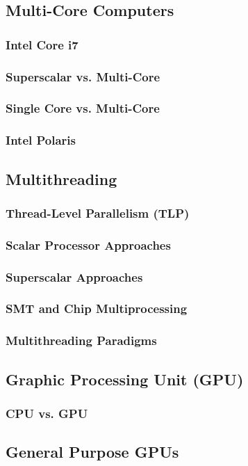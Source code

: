 \documentclass[titlepage, a4paper]{article}
\begin{document}
\subsection{Multi-Core Computers}
\subsubsection{Intel Core i7}
\subsubsection{Superscalar vs. Multi-Core}
\subsubsection{Single Core vs. Multi-Core}
\subsubsection{Intel Polaris}
\subsection{Multithreading}
\subsubsection{Thread-Level Parallelism (TLP)}
\subsubsection{Scalar Processor Approaches}
\subsubsection{Superscalar Approaches}
\subsubsection{SMT and Chip Multiprocessing}
\subsubsection{Multithreading Paradigms}
\subsection{Graphic Processing Unit (GPU)}
\subsubsection{CPU vs. GPU}
\subsection{General Purpose GPUs}
\end{document}
